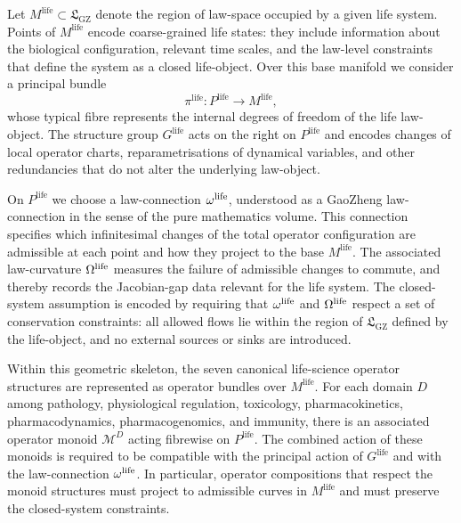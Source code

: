 \documentclass[11pt]{book}
\theoremstyle{plain}
\theoremstyle{definition}
\theoremstyle{remark}
\newcommand{\GZLS}{\ensuremath{\mathfrak{L}_{\mathrm{GZ}}}}       \newcommand{\GZLT}{\ensuremath{M_{!w}}}                           \newcommand{\GZLOC}{\ensuremath{A_M}}                             \newcommand{\GZLCurv}{\ensuremath{\mathcal{F}_{\mathrm{law}}}}
\begin{document}
Let $M^{\mathrm{life}} \subset \GZLS$ denote the region of law-space
occupied by a given life system. Points of $M^{\mathrm{life}}$ encode
coarse-grained life states: they include information about the
biological configuration, relevant time scales, and the law-level
constraints that define the system as a closed life-object. Over this
base manifold we consider a principal bundle
\[
  \pi^{\mathrm{life}} \colon P^{\mathrm{life}} \to M^{\mathrm{life}},
\]
whose typical fibre represents the internal degrees of freedom of the
life law-object. The structure group $G^{\mathrm{life}}$ acts on the
right on $P^{\mathrm{life}}$ and encodes changes of local operator
charts, reparametrisations of dynamical variables, and other
redundancies that do not alter the underlying law-object.

On $P^{\mathrm{life}}$ we choose a law-connection
$\omega^{\mathrm{life}}$, understood as a GaoZheng law-connection in
the sense of the pure mathematics volume. This connection specifies
which infinitesimal changes of the total operator configuration are
admissible at each point and how they project to the base
$M^{\mathrm{life}}$. The associated law-curvature
$\Omega^{\mathrm{life}}$ measures the failure of admissible changes to
commute, and thereby records the Jacobian-gap data relevant for the
life system. The closed-system assumption is encoded by requiring that
$\omega^{\mathrm{life}}$ and $\Omega^{\mathrm{life}}$ respect a set of
conservation constraints: all allowed flows lie within the region of
$\GZLS$ defined by the life-object, and no external sources or sinks
are introduced.

Within this geometric skeleton, the seven canonical life-science
operator structures are represented as operator bundles over
$M^{\mathrm{life}}$. For each domain $D$ among pathology, physiological
regulation, toxicology, pharmacokinetics, pharmacodynamics,
pharmacogenomics, and immunity, there is an associated operator
monoid $\mathcal{M}^{D}$ acting fibrewise on $P^{\mathrm{life}}$. The
combined action of these monoids is required to be compatible with the
principal action of $G^{\mathrm{life}}$ and with the law-connection
$\omega^{\mathrm{life}}$. In particular, operator compositions that
respect the monoid structures must project to admissible curves in
$M^{\mathrm{life}}$ and must preserve the closed-system constraints.
\end{document}
